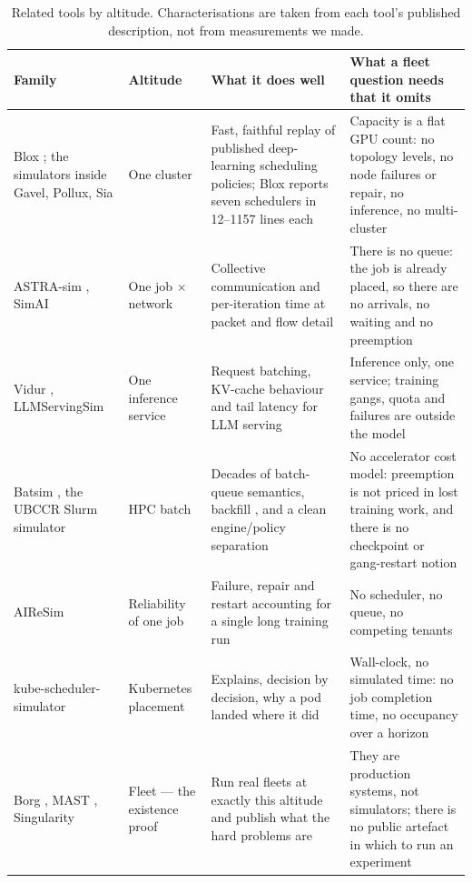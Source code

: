 \begin{table}[!t]
\centering
\small
\caption{Related tools by altitude. Characterisations are taken from each
tool's published description, not from measurements we made.}
\label{tab:related}
\begin{tabular}{@{}p{2.6cm}p{2.2cm}p{4.0cm}p{4.3cm}@{}}
\toprule
\raggedright Family & \raggedright Altitude & \raggedright What it does well & \raggedright What a fleet question needs that it omits \tabularnewline
\midrule
\raggedright Blox \cite{blox2024}; the simulators inside Gavel, Pollux, Sia
  & \raggedright One cluster
  & \raggedright Fast, faithful replay of published deep-learning scheduling policies; Blox reports seven schedulers in 12--1157 lines each
  & \raggedright Capacity is a flat GPU count: no topology levels, no node failures or repair, no inference, no multi-cluster \tabularnewline
\addlinespace
\raggedright ASTRA-sim \cite{astrasim2023}, SimAI \cite{simai2025}
  & \raggedright One job $\times$ network
  & \raggedright Collective communication and per-iteration time at packet and flow detail
  & \raggedright There is no queue: the job is already placed, so there are no arrivals, no waiting and no preemption \tabularnewline
\addlinespace
\raggedright Vidur \cite{vidur2024}, LLMServingSim
  & \raggedright One inference service
  & \raggedright Request batching, KV-cache behaviour and tail latency for LLM serving
  & \raggedright Inference only, one service; training gangs, quota and failures are outside the model \tabularnewline
\addlinespace
\raggedright Batsim \cite{batsim2016}, the UBCCR Slurm simulator
  & \raggedright HPC batch
  & \raggedright Decades of batch-queue semantics, backfill \cite{easybackfill1995}, and a clean engine/policy separation
  & \raggedright No accelerator cost model: preemption is not priced in lost training work, and there is no checkpoint or gang-restart notion \tabularnewline
\addlinespace
\raggedright AIReSim \cite{aireesim}
  & \raggedright Reliability of one job
  & \raggedright Failure, repair and restart accounting for a single long training run
  & \raggedright No scheduler, no queue, no competing tenants \tabularnewline
\addlinespace
\raggedright kube-scheduler-simulator \cite{kubescheduler}
  & \raggedright Kubernetes placement
  & \raggedright Explains, decision by decision, why a pod landed where it did
  & \raggedright Wall-clock, no simulated time: no job completion time, no occupancy over a horizon \tabularnewline
\addlinespace
\raggedright Borg \cite{borg2015,borgtng2020}, MAST \cite{mast2024}, Singularity \cite{singularity2022}
  & \raggedright Fleet --- the existence proof
  & \raggedright Run real fleets at exactly this altitude and publish what the hard problems are
  & \raggedright They are production systems, not simulators; there is no public artefact in which to run an experiment \tabularnewline
\bottomrule
\end{tabular}
\end{table}


